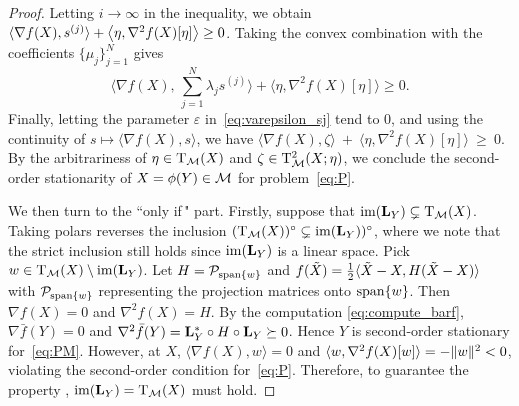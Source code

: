 \begin{proof}
    Letting $i\to\infty$ in the inequality, we obtain $\langle {\nabla f(X),s^{(j)}} \rangle  + \left\langle\eta,\nabla^2 f(X)[\eta]\right \rangle \ge 0$. Taking the convex combination with the coefficients $\{\mu_j\}_{j=1}^N$ gives
    \begin{equation*}
        \Big\langle \nabla f(X),\,\sum_{j=1}^N \lambda_j s^{(j)}\Big\rangle + \langle \eta,\nabla^2 f(X)[\eta]\rangle\ge 0.
    \end{equation*}
    Finally, letting the parameter $\varepsilon$ in~\eqref{eq:varepsilon_sj} tend to $0$, and using the continuity of $s\mapsto \langle \nabla f(X),s\rangle$, we have $\langle \nabla f(X),\zeta\rangle\ +\ \langle \eta,\nabla^2 f(X)[\eta]\rangle\ \ge\ 0$. By the arbitrariness of $\eta\in\mathrm{T}_{\mathcal{M}}(X)$ and $\zeta\in\mathrm{T}^2_{\mathcal{M}}(X;\eta)$, we conclude the second-order stationarity of $X=\phi(Y)\in\mathcal{M}$ for problem~\eqref{eq:P}.

    
    We then turn to the ``only if\," part. Firstly, suppose that $\operatorname{im}(\mathrm{\bf L}_Y)\subsetneq \mathrm{T}_{\mathcal{M}}(X)$. Taking polars reverses the inclusion $(\mathrm{T}_{\mathcal{M}}(X))^{\circ}\subsetneq\operatorname{im}(\mathrm{\bf L}_Y))^{\circ}$, where we note that the strict inclusion still holds since $\operatorname{im}(\mathrm{\bf L}_Y)$ is a linear space. Pick $w\in \mathrm{T}_{\mathcal{M}}(X)\setminus \operatorname{im}(\mathrm{\bf L}_Y)$. Let $H=\mathcal{P}_{\operatorname{span}\{w\}}$ and $f(\tilde{X})=\tfrac12\langle {\tilde{X}-X, H(\tilde{X}-X)} \rangle$ with $\mathcal{P}_{\operatorname{span}\{w\}}$ representing the projection matrices onto $\operatorname{span}\{w\}$. Then $\nabla f(X)=0$ and $\nabla^2 f(X)=H$. By the computation \eqref{eq:compute_barf}, $\nabla\bar f(Y)=0$ and $\nabla^2\bar f(Y)=\mathrm{\bf L}_Y^*\circ H\circ\mathrm{\bf L}_Y\succeq 0$. Hence $Y$ is second-order stationary for~\eqref{eq:PM}. However, at $X$, $\langle \nabla f(X),w\rangle=0$ and $\langle {w,\nabla^2 f(X)[w]} \rangle=-\|w\|^2<0$, violating the second-order condition for~\eqref{eq:P}. Therefore, to guarantee the property \twototwo, $\operatorname{im}(\mathrm{\bf L}_Y)=\mathrm{T}_{\mathcal{M}}(X)$ must hold.



\end{proof}
